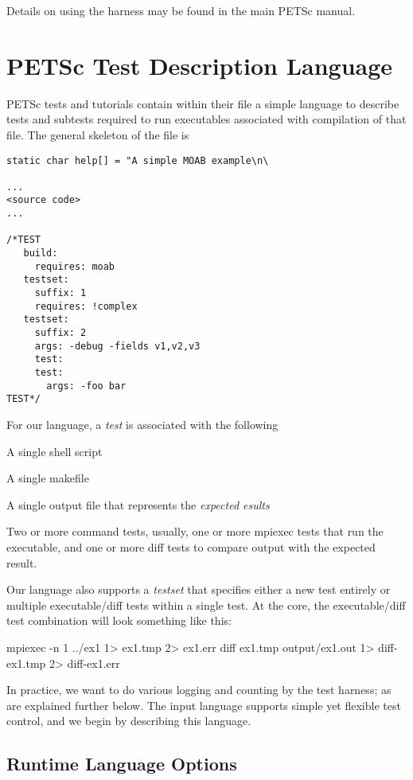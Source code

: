 Details on using the harness may be found in the main PETSc manual.

\section{PETSc Test Description Language%
  \label{petsc-test-description-language}%
}

PETSc tests and tutorials contain within their file a simple language to
describe tests and subtests required to run executables associated with
compilation of that file.  The general skeleton of the file is
%
\begin{lstlisting}
static char help[] = "A simple MOAB example\n\

...
<source code>
...

/*TEST
   build:
     requires: moab
   testset:
     suffix: 1
     requires: !complex
   testset:
     suffix: 2
     args: -debug -fields v1,v2,v3
     test:
     test:
       args: -foo bar
TEST*/
\end{lstlisting}

For our language, a \emph{test} is associated with the following
\begin{tightitemize}
  \item A single shell script
  \item A single makefile
  \item A single output file that represents the \emph{expected
       esults}
  \item Two or more command tests, usually, one or more mpiexec
        tests that run the executable, and one or more diff tests to
        compare output with the expected result.
\end{tightitemize}
Our language also supports a \emph{testset} that specifies
either a new test entirely or multiple executable/diff tests
within a single test.  At the core, the executable/diff test combination
will look something like this:
\begin{bashlisting}
mpiexec -n 1 ../ex1 1> ex1.tmp 2> ex1.err
diff ex1.tmp output/ex1.out 1> diff-ex1.tmp 2> diff-ex1.err
\end{bashlisting}

In practice, we want to do various logging and counting by the test
harness; as are explained further below.  The input language
supports simple yet flexible test control, and we begin by
describing this language.


\subsection{Runtime Language Options%
  \label{runtime-language-options}%
}

